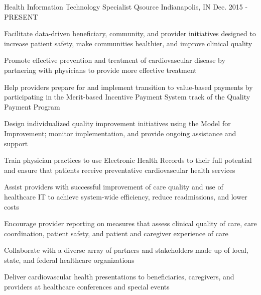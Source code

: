 \begin{cventries}
  \cventry
    {Health Information Technology Specialist} %
    {Qsource} %
    {Indianapolis, IN} %
    {Dec. 2015 - PRESENT} %
    {
      \begin{cvitems} %
      \item {Facilitate data-driven beneficiary, community, and provider initiatives designed to increase patient safety, make communities healthier, and improve clinical quality}
      \item {Promote effective prevention and treatment of cardiovascular disease by partnering with physicians to provide more effective treatment}
        \item {Help providers prepare for and implement transition to value-based payments by participating in the Merit-based Incentive Payment System track of the Quality Payment Program}
    \item {Design individualized quality improvement initiatives using the Model for Improvement; monitor implementation, and provide ongoing assistance and support}
    \item {Train physician practices to use Electronic Health Records to their full potential and ensure that patients receive preventative cardiovascular health services}
    \item {Assist providers with successful improvement of care quality and use of healthcare IT to achieve system-wide efficiency, reduce readmissions, and lower costs}
    \item {Encourage provider reporting on measures that assess clinical quality of care, care coordination, patient safety, and patient and caregiver experience of care}
    \item {Collaborate with a diverse array of partners and stakeholders made up of local, state, and federal healthcare organizations}
    \item {Deliver cardiovascular health presentations to beneficiaries, caregivers, and providers at healthcare conferences and special events}
  \end{cvitems}
    }


\end{cventries}
